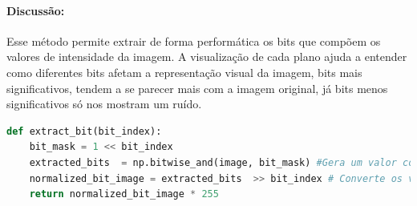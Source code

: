 \documentclass[12pt,a4paper]{report}
\begin{document}
\paragraph{Discussão:} 
Esse método permite extrair de forma performática os bits que compõem os valores de intensidade da imagem. A visualização de cada plano ajuda a entender como diferentes bits afetam a representação visual da imagem, bits mais significativos, tendem a se parecer mais com a imagem original, já bits menos significativos só nos mostram um ruído.
\begin{lstlisting}[language=Python, caption={Função utilizada para extração de bits}]
def extract_bit(bit_index):
    bit_mask = 1 << bit_index 
    extracted_bits  = np.bitwise_and(image, bit_mask) #Gera um valor como 00100000
    normalized_bit_image = extracted_bits  >> bit_index # Converte os valores como 00000000 ou 00100000 para 0 ou 1
    return normalized_bit_image * 255
\end{lstlisting}
\end{document}
